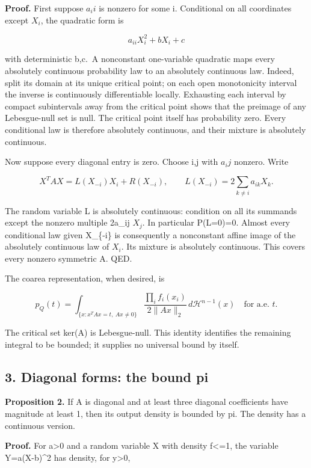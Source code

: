 \documentclass[
  11pt,
]{article}
\begin{document}
\textbf{Proof.} First suppose \(a_ii\) is nonzero for some i.
Conditional on all coordinates except \(X_i\), the quadratic form is

\[
a_{ii}X_i^2+bX_i+c
\]

with deterministic b,c.~A nonconstant one-variable quadratic maps every
absolutely continuous probability law to an absolutely continuous law.
Indeed, split its domain at its unique critical point; on each open
monotonicity interval the inverse is continuously differentiable
locally. Exhausting each interval by compact subintervals away from the
critical point shows that the preimage of any Lebesgue-null set is null.
The critical point itself has probability zero. Every conditional law is
therefore absolutely continuous, and their mixture is absolutely
continuous.

Now suppose every diagonal entry is zero. Choose i,j with \(a_ij\)
nonzero. Write

\[
X^TAX=L(X_{-i})X_i+R(X_{-i}),\qquad
L(X_{-i})=2\sum_{k\ne i}a_{ik}X_k.
\]

The random variable L is absolutely continuous: condition on all its
summands except the nonzero multiple 2a\_ij \(X_j\). In particular
P(L=0)=0. Almost every conditional law given X\_\{-i\} is consequently a
nonconstant affine image of the absolutely continuous law of \(X_i\).
Its mixture is absolutely continuous. This covers every nonzero
symmetric A. QED.

The coarea representation, when desired, is

\[
p_Q(t)=\int_{\{x:x^TAx=t,\ Ax\ne0\}}
\frac{\prod_i f_i(x_i)}{2\lVert Ax\rVert_2}\,d\mathcal H^{n-1}(x)
\quad\text{for a.e. }t.
\]

The critical set ker(A) is Lebesgue-null. This identity identifies the
remaining integral to be bounded; it supplies no universal bound by
itself.

\subsection{3. Diagonal forms: the bound
pi}\label{diagonal-forms-the-bound-pi}

\textbf{Proposition 2.} If A is diagonal and at least three diagonal
coefficients have magnitude at least 1, then its output density is
bounded by pi. The density has a continuous version.

\textbf{Proof.} For a\textgreater0 and a random variable X with density
f\textless=1, the variable Y=a(X-b)\^{}2 has density, for
y\textgreater0,
\end{document}
